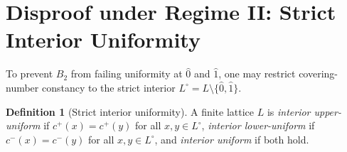 \documentclass[11pt,a4paper]{article}
\theoremstyle{definition}
\newtheorem{definition}[theorem]{Definition}
\theoremstyle{remark}
\begin{document}
\section{Disproof under Regime II: Strict Interior Uniformity}

To prevent $B_2$ from failing uniformity at $\hat{0}$ and $\hat{1}$, one may restrict covering-number constancy to the strict interior $L^\circ = L \setminus \{\hat{0}, \hat{1}\}$.

\begin{definition}[Strict interior uniformity]\label{def:interior}
A finite lattice $L$ is \emph{interior upper-uniform} if $c^+(x) = c^+(y)$ for all $x, y \in L^\circ$, \emph{interior lower-uniform} if $c^-(x) = c^-(y)$ for all $x, y \in L^\circ$, and \emph{interior uniform} if both hold.
\end{definition}
\end{document}
